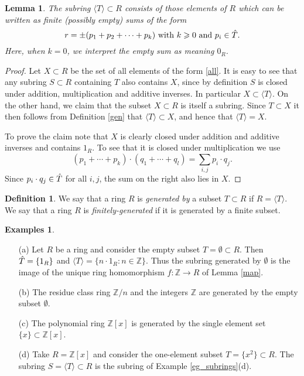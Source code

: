 \documentclass [12pt,oneside,a4paper,mathscr]{amsart}
\newtheorem{lemma}[thm]{Lemma}
\theoremstyle{definition}
\newtheorem{defn}[thm]{Definition}
\newtheorem{examples}[thm]{Examples}
\renewcommand{\geq}{\geqslant}
\newcommand{\Z}{\mathbb Z}
\begin{document}
\begin{lemma}
\label{neil}
The subring $\langle T \rangle\subset R$ consists of those elements of $R$ which can be written as  finite (possibly empty)  sums of the form
\begin{equation}
\label{all}
r= \pm ( p_1 + p_2+  \cdots +  p_k) \text{ with } k \geq 0 \text{ and }p_i\in \Hat{T}.\end{equation}
Here, when $k=0$, we interpret the empty sum as meaning $0_R$.
\end{lemma}

\begin{proof}
Let $X\subset R$ be the set of all elements of the form  \eqref{all}. It is easy to  see that any subring $S \subset R$ containing $T$ also contains $X$, since by definition $S$ is closed under addition, multiplication and additive inverses. In particular $X\subset \langle T \rangle$. On the other hand, we claim that the subset $X\subset R$ is itself a subring. Since $T\subset X$ it then follows from Definition \ref{gen} that $\langle T \rangle\subset X$, and hence that $\langle T \rangle = X$.

To prove the claim note that $X$ is clearly closed under addition and additive inverses and contains $1_R$. To see that it is closed under multiplication we use
\[(p_1+\cdots+ p_k) \cdot (q_1+\cdots +q_l)=\sum_{i,j} p_i\cdot q_j.\]
Since $p_i\cdot q_j\in \Hat{T}$ for all $i,j$,  the sum on the right also lies in $X$.
\end{proof}



\begin{defn}We say that a ring $R$ is \emph{generated by} a subset $T\subset R$ if $R=\langle T \rangle$. We say that a ring $R$ is \emph{finitely-generated} if it is generated by a finite subset.\end{defn}

\begin{examples}
\begin{itemize}
\item[(a)]
Let $R$ be a ring and consider the empty subset $T=\emptyset\subset R$. Then $\Hat{T}=\{1_R\}$ and $\langle T\rangle=\{n\cdot 1_R: n\in \Z\}$. Thus the subring generated by $\emptyset$ is the image of the unique ring homomorphism $f\colon \Z \to R$ of Lemma \ref{map}.
\smallskip

\item[(b)] The residue class ring $\Z/n$ and the integers $\Z$ are generated by the empty subset $\emptyset$.
\smallskip
\item[(c)] The polynomial ring $\Z[x]$ is generated by the single element set $\{x\}\subset \Z[x]$.
\smallskip
\item[(d)] Take $R=\Z[x]$ and consider the one-element subset $T=\{x^2\}\subset R$. The subring $S=\langle T \rangle\subset R$  is the subring of Example \ref{eg_subrings}(d).
\end{itemize}
\end{examples}
\end{document}
